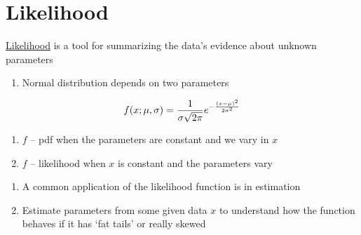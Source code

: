 \documentclass[aspectratio=1610,pdftex,dvipsnames,compress,xcolor={dvipsnames}]{beamer}
\newcommand{\acs}{\acrshort} %
\begin{document}
\section{Likelihood}


\addtocounter{framenumber}{-1}
\begin{frame}{\href{https://uidaho.pressbooks.pub/riskassessment/chapter/likelihood/}{Likelihood} is a tool for summarizing the data’s evidence about unknown parameters}
    \begin{enumerate}[series=outerlist,topsep=0pt,itemsep=3pt,leftmargin=*,label=(\arabic*)]
        \item[]Normal distribution depends on two parameters
    \end{enumerate}

    \vspace*{\fill}

    \begin{equation}
        \Large
        f(x;\mu,\sigma) = \frac{1}{\sigma\sqrt{2\pi}} e^{-\frac{(x-\mu)^2}{2\sigma^2}}
    \end{equation}

    \vspace*{\fill}

    \begin{enumerate}[series=outerlist,topsep=0pt,itemsep=11pt,leftmargin=*,label=(\arabic*)]
        \item[] $f$ -- \acs{pdf} when the parameters are constant and we vary in $x$
        \item[] $f$ -- likelihood when $x$ is constant and the parameters vary
    \end{enumerate}

    \vspace*{\fill}

    \begin{enumerate}[series=outerlist,topsep=0pt,itemsep=11pt,leftmargin=*,label=(\arabic*)]
        \item[]A common application of the likelihood function is in estimation
        \item[]Estimate parameters from some given data $x$ to understand how the function behaves if it has `fat tails' or really skewed
    \end{enumerate}
\end{frame}
\end{document}

